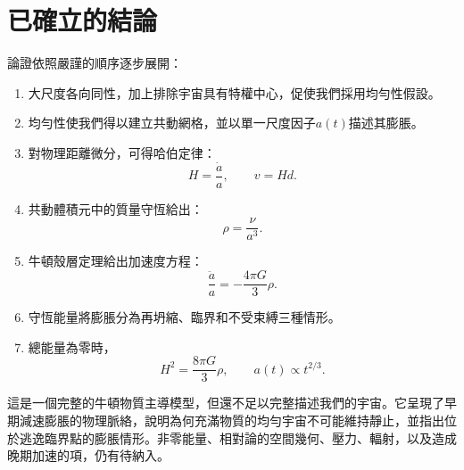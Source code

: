 \begin{classroomqa}
\end{classroomqa}

\section{已確立的結論}

論證依照嚴謹的順序逐步展開：
\begin{enumerate}
\item 大尺度各向同性，加上排除宇宙具有特權中心，促使我們採用均勻性假設。
\item 均勻性使我們得以建立共動網格，並以單一尺度因子\(a(t)\)描述其膨脹。
\item 對物理距離微分，可得哈伯定律：
  \[
  H=\frac{\dot a}{a},
  \qquad
  v=Hd.
  \]
\item 共動體積元中的質量守恆給出：
  \[
  \rho=\frac{\nu}{a^3}.
  \]
\item 牛頓殼層定理給出加速度方程：
  \[
  \frac{\ddot a}{a}=-\frac{4\pi G}{3}\rho.
  \]
\item 守恆能量將膨脹分為再坍縮、臨界和不受束縛三種情形。
\item 總能量為零時，
  \[
  H^2=\frac{8\pi G}{3}\rho,
  \qquad
  a(t)\propto t^{2/3}.
  \]
\end{enumerate}

這是一個完整的牛頓物質主導模型，但還不足以完整描述我們的宇宙。它呈現了早期減速膨脹的物理脈絡，說明為何充滿物質的均勻宇宙不可能維持靜止，並指出位於逃逸臨界點的膨脹情形。非零能量、相對論的空間幾何、壓力、輻射，以及造成晚期加速的項，仍有待納入。